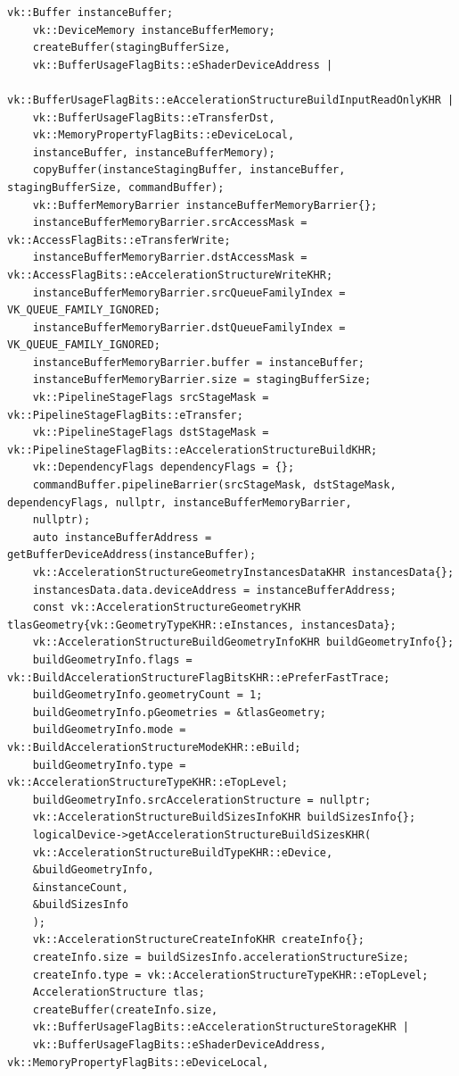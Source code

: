 \documentclass[11pt]{scrartcl}
\begin{document}
\begin{lstlisting}[caption={Erzeugung der Top-Level Acceleration Structure in VulkanRenderer.cpp},label={lst:listing-vulkan-createtlascpp}]
	vk::Buffer instanceBuffer;
	vk::DeviceMemory instanceBufferMemory;
	createBuffer(stagingBufferSize,
	vk::BufferUsageFlagBits::eShaderDeviceAddress |
	vk::BufferUsageFlagBits::eAccelerationStructureBuildInputReadOnlyKHR |
	vk::BufferUsageFlagBits::eTransferDst,
	vk::MemoryPropertyFlagBits::eDeviceLocal,
	instanceBuffer, instanceBufferMemory);
	copyBuffer(instanceStagingBuffer, instanceBuffer, stagingBufferSize, commandBuffer);
	vk::BufferMemoryBarrier instanceBufferMemoryBarrier{};
	instanceBufferMemoryBarrier.srcAccessMask = vk::AccessFlagBits::eTransferWrite;
	instanceBufferMemoryBarrier.dstAccessMask = vk::AccessFlagBits::eAccelerationStructureWriteKHR;
	instanceBufferMemoryBarrier.srcQueueFamilyIndex = VK_QUEUE_FAMILY_IGNORED;
	instanceBufferMemoryBarrier.dstQueueFamilyIndex = VK_QUEUE_FAMILY_IGNORED;
	instanceBufferMemoryBarrier.buffer = instanceBuffer;
	instanceBufferMemoryBarrier.size = stagingBufferSize;
	vk::PipelineStageFlags srcStageMask = vk::PipelineStageFlagBits::eTransfer;
	vk::PipelineStageFlags dstStageMask = vk::PipelineStageFlagBits::eAccelerationStructureBuildKHR;
	vk::DependencyFlags dependencyFlags = {};
	commandBuffer.pipelineBarrier(srcStageMask, dstStageMask, dependencyFlags, nullptr, instanceBufferMemoryBarrier,
	nullptr);
	auto instanceBufferAddress = getBufferDeviceAddress(instanceBuffer);
	vk::AccelerationStructureGeometryInstancesDataKHR instancesData{};
	instancesData.data.deviceAddress = instanceBufferAddress;
	const vk::AccelerationStructureGeometryKHR tlasGeometry{vk::GeometryTypeKHR::eInstances, instancesData};
	vk::AccelerationStructureBuildGeometryInfoKHR buildGeometryInfo{};
	buildGeometryInfo.flags = vk::BuildAccelerationStructureFlagBitsKHR::ePreferFastTrace;
	buildGeometryInfo.geometryCount = 1;
	buildGeometryInfo.pGeometries = &tlasGeometry;
	buildGeometryInfo.mode = vk::BuildAccelerationStructureModeKHR::eBuild;
	buildGeometryInfo.type = vk::AccelerationStructureTypeKHR::eTopLevel;
	buildGeometryInfo.srcAccelerationStructure = nullptr;
	vk::AccelerationStructureBuildSizesInfoKHR buildSizesInfo{};
	logicalDevice->getAccelerationStructureBuildSizesKHR(
	vk::AccelerationStructureBuildTypeKHR::eDevice,
	&buildGeometryInfo,
	&instanceCount,
	&buildSizesInfo
	);
	vk::AccelerationStructureCreateInfoKHR createInfo{};
	createInfo.size = buildSizesInfo.accelerationStructureSize;
	createInfo.type = vk::AccelerationStructureTypeKHR::eTopLevel;
	AccelerationStructure tlas;
	createBuffer(createInfo.size,
	vk::BufferUsageFlagBits::eAccelerationStructureStorageKHR |
	vk::BufferUsageFlagBits::eShaderDeviceAddress, vk::MemoryPropertyFlagBits::eDeviceLocal,

\end{lstlisting}
\end{document}
